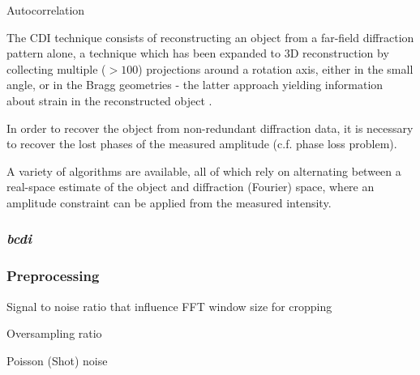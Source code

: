 Autocorrelation

The CDI technique consists of reconstructing an object from a far-field diffraction pattern alone, a technique which has been expanded to 3D reconstruction by collecting multiple ($>100$) projections around a rotation axis, either in the small angle, or in the Bragg geometries - the latter approach yielding information about strain in the reconstructed object \parencite{Li2020}.

In order to recover the object from non-redundant diffraction data, it is necessary to recover the lost phases of the measured amplitude (c.f. phase loss problem).

A variety of algorithms are available, all of which rely on alternating between a real-space estimate of the object and diffraction (Fourier) space, where an amplitude constraint can be applied from the measured intensity.


\subsubsection{\textit{bcdi}}

\subsubsection{Preprocessing}

Signal to noise ratio that influence FFT window size for cropping

Oversampling ratio

Poisson (Shot) noise 
